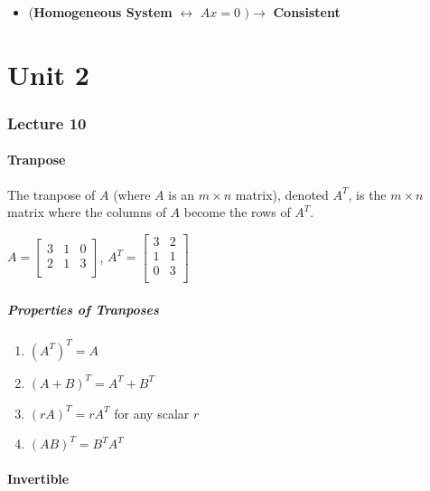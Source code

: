 \documentclass[12pt, letterpaper]{article}
\begin{document}
\begin{itemize}
  \item (\textbf{Homogeneous System} $ \leftrightarrow $ $ Ax = 0 $
    $) \rightarrow $ \textbf{Consistent}
\end{itemize}

\part*{Unit 2}

\section*{Lecture 10}

\subsection*{Tranpose}

The tranpose of $ A $ (where $ A $ is an $ m \times n $ matrix),
denoted $ A^T $, is the $ m \times n $ matrix where the columns of $
A $ become the rows of $ A^T $.

\medskip
{\centering

  $ A =
  \begin{bmatrix}
    3 & 1 & 0 \\
    2 & 1 & 3 \\
  \end{bmatrix} $,
  $ A^T =
  \begin{bmatrix}
    3 & 2 \\
    1 & 1 \\
    0 & 3 \\
  \end{bmatrix} $

}
\medskip

\subsubsection*{Properties of Tranposes}

\begin{enumerate}
  \item $ (A^T)^T = A $
  \item $ (A + B)^T = A^T + B^T $
  \item $ (rA)^T = rA^T $ for any scalar $ r $
  \item $ (AB)^T = B^TA^T $
\end{enumerate}

\subsection*{Invertible}
\end{document}
